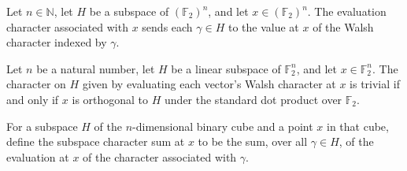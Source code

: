 \begin{definition}
\label{FABL.subspaceEvaluationCharacter}
\leanok
{}
Let $n\in\mathbb{N}$, let $H$ be a subspace of $(\mathbb{F}_2)^n$, and let
$x\in(\mathbb{F}_2)^n$. The evaluation character associated with $x$ sends each
$\gamma\in H$ to the value at $x$ of the Walsh character indexed by $\gamma$.
\end{definition}

\begin{theorem}
\label{FABL.subspaceEvaluationCharacter_eq_zero_iff}
\leanok
{}
Let $n$ be a natural number, let $H$ be a linear subspace of $\mathbb{F}_2^n$, and let
$x\in\mathbb{F}_2^n$. The character on $H$ given by evaluating each vector's Walsh
character at $x$ is trivial if and only if $x$ is orthogonal to $H$ under the standard
dot product over $\mathbb{F}_2$.
\end{theorem}

\begin{definition}
\label{FABL.subspaceCharacterSum}
\leanok
{}
For a subspace $H$ of the $n$-dimensional binary cube and a point $x$ in that cube,
define the subspace character sum at $x$ to be the sum, over all $\gamma\in H$, of the
evaluation at $x$ of the character associated with $\gamma$.
\end{definition}

